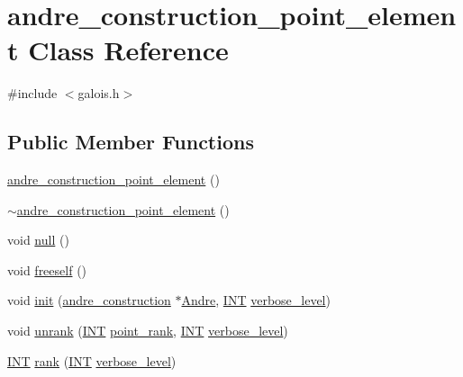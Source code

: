 \hypertarget{classandre__construction__point__element}{}\section{andre\+\_\+construction\+\_\+point\+\_\+element Class Reference}
\label{classandre__construction__point__element}


{\ttfamily \#include $<$galois.\+h$>$}

\subsection*{Public Member Functions}
\begin{DoxyCompactItemize}
\item 
\mbox{\hyperlink{classandre__construction__point__element_a39a89c7d89f2e9f2c8dba176d777695c}{andre\+\_\+construction\+\_\+point\+\_\+element}} ()
\item 
\mbox{\hyperlink{classandre__construction__point__element_a9a65c0d303e96444945084fd86e387c3}{$\sim$andre\+\_\+construction\+\_\+point\+\_\+element}} ()
\item 
void \mbox{\hyperlink{classandre__construction__point__element_aeebe8ebc5efdeb8e0e887891846a181f}{null}} ()
\item 
void \mbox{\hyperlink{classandre__construction__point__element_aa95006664d49cfb5b67714b8a3e4e5b6}{freeself}} ()
\item 
void \mbox{\hyperlink{classandre__construction__point__element_a010b5c30b835fc93e56cafe7b9f411d2}{init}} (\mbox{\hyperlink{classandre__construction}{andre\+\_\+construction}} $\ast$\mbox{\hyperlink{classandre__construction__point__element_adac4a573d7298bc4b477bf40985ed49a}{Andre}}, \mbox{\hyperlink{galois_8h_a09fddde158a3a20bd2dcadb609de11dc}{I\+NT}} \mbox{\hyperlink{simeon_8_c_a818073fbcc2f439e7c56952f67386122}{verbose\+\_\+level}})
\item 
void \mbox{\hyperlink{classandre__construction__point__element_a12bb396e845ab283cd00ef12a525c7e1}{unrank}} (\mbox{\hyperlink{galois_8h_a09fddde158a3a20bd2dcadb609de11dc}{I\+NT}} \mbox{\hyperlink{classandre__construction__point__element_a9bc378c6862765936e1a6e533c029a34}{point\+\_\+rank}}, \mbox{\hyperlink{galois_8h_a09fddde158a3a20bd2dcadb609de11dc}{I\+NT}} \mbox{\hyperlink{simeon_8_c_a818073fbcc2f439e7c56952f67386122}{verbose\+\_\+level}})
\item 
\mbox{\hyperlink{galois_8h_a09fddde158a3a20bd2dcadb609de11dc}{I\+NT}} \mbox{\hyperlink{classandre__construction__point__element_a8054d4b0368eb6d315a6933051b4fd20}{rank}} (\mbox{\hyperlink{galois_8h_a09fddde158a3a20bd2dcadb609de11dc}{I\+NT}} \mbox{\hyperlink{simeon_8_c_a818073fbcc2f439e7c56952f67386122}{verbose\+\_\+level}})
\end{DoxyCompactItemize}
